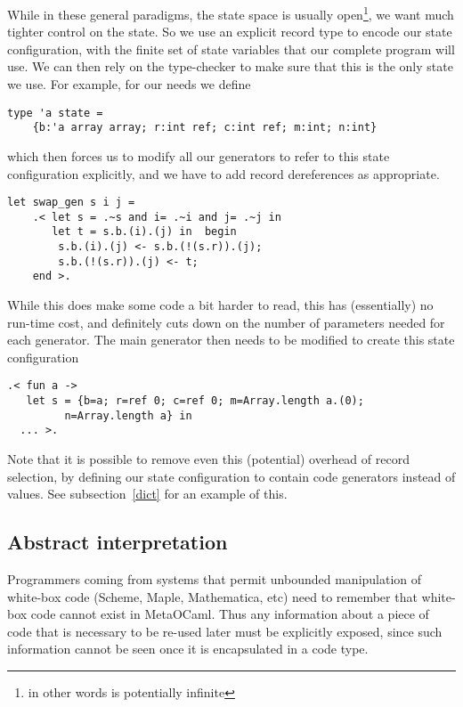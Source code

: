 \documentclass[11pt]{elsart}
\begin{document}
While in these general paradigms, the state space is usually 
open\footnote{in other words is potentially infinite}, we want much tighter
control on the state.  So we use an explicit record type to encode our
state configuration, with the finite
set of state variables that our complete program will use.  We can then
rely on the type-checker to make sure that this is the only state we use.
For example, for our needs we define
\begin{small}
\begin{verbatim}
type 'a state = 
    {b:'a array array; r:int ref; c:int ref; m:int; n:int}
\end{verbatim}
\end{small}
\noindent which then forces us to modify all our generators
to refer to this state configuration explicitly, and we have to add record
dereferences as appropriate.
\begin{small}
\begin{verbatim}
let swap_gen s i j =
    .< let s = .~s and i= .~i and j= .~j in
       let t = s.b.(i).(j) in  begin
        s.b.(i).(j) <- s.b.(!(s.r)).(j);
        s.b.(!(s.r)).(j) <- t;
    end >.
\end{verbatim}
\end{small}
\noindent  While this does make some code a bit harder to read, this
has (essentially) no run-time cost, and definitely cuts down on the 
number of parameters
needed for each generator.  The main generator then needs to be modified
to create this state configuration
\begin{small}
\begin{verbatim}
.< fun a -> 
   let s = {b=a; r=ref 0; c=ref 0; m=Array.length a.(0); 
         n=Array.length a} in
  ... >.
\end{verbatim}
\end{small}

Note that it is possible to remove even this (potential) overhead of
record selection, by defining our state configuration to contain
code generators instead of values.  See subsection~\ref{dict} for
an example of this.

\subsection{Abstract interpretation}

Programmers coming from systems that permit unbounded manipulation of 
white-box code (Scheme, Maple, Mathematica, etc) need to remember that
white-box code cannot exist
in MetaOCaml.  Thus any information about a piece of code that is necessary to
be re-used later must be explicitly exposed, since such information cannot be
seen once it is encapsulated in a code type.
\end{document}
